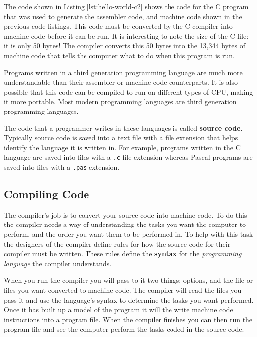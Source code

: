 
The code shown in Listing \ref{lst:hello-world-c2} shows the code for the C program that was used to generate the assembler code, and machine code shown in the previous code listings. This code must be converted by the C compiler into machine code before it can be run. It is interesting to note the size of the C file: it is only 50 bytes! The compiler converts this 50 bytes into the 13,344 bytes of machine code that tells the computer what to do when this program is run.

Programs written in a third generation programming language are much more understandable than their assembler or machine code counterparts. It is also possible that this code can be compiled to run on different types of CPU, making it more portable. Most modern programming languages are third generation programming languages.

The code that a programmer writes in these languages is called \textbf{source code}. Typically source code is saved into a text file with a file extension that helps identify the language it is written in. For example, programs written in the C language are saved into files with a {\tt .c} file extension whereas Pascal programs are saved into files with a {\tt .pas} extension.

\clearpage
\subsection{Compiling Code} %
\label{sub:compiling_code}

The compiler's job is to convert your source code into machine code. To do this the compiler needs a way of understanding the tasks you want the computer to perform, and the order you want them to be performed in. To help with this task the designers of the compiler define rules for how the source code for their compiler must be written. These rules define the \textbf{syntax} for the \emph{programming language} the compiler understands.

When you run the compiler you will pass to it two things: options, and the file or files you want converted to machine code. The compiler will read the files you pass it and use the language's syntax to determine the tasks you want performed. Once it has built up a model of the program it will the write machine code instructions into a program file. When the compiler finishes you can then run the program file and see the computer perform the tasks coded in the source code.

